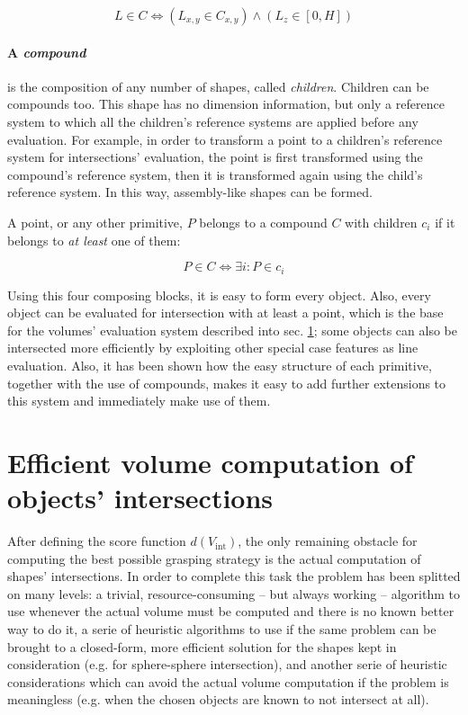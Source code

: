 \begin{equation}
  L \in C \Leftrightarrow
  \left(L_{x,y} \in C_{x,y} \right)
  \wedge
  \left(L_{z} \in [0,H] \right)
\end{equation}

\paragraph{A \emph{compound}} is the composition of any number of shapes, called
\emph{children}. Children can be compounds too. This shape has no dimension
information, but only a reference system to which all the children's reference
systems are applied before any evaluation. For example, in order to transform a
point to a children's reference system for intersections' evaluation, the point
is first transformed using the compound's reference system, then it is
transformed again using the child's reference system. In this way, assembly-like
shapes can be formed.

A point, or any other primitive, $P$ belongs to a compound $C$ with children $c_i$ if it belongs to
\emph{at least} one of them:

\begin{equation}
  P \in C \Leftrightarrow \exists i : P \in c_i
\end{equation}

Using this four composing blocks, it is easy to form every object. Also, every
object can be evaluated for intersection with at least a point, which is the
base for the volumes' evaluation system described into sec.
\ref{sec:grasp_computing}; some objects can also be intersected more efficiently by
exploiting other special case features as line evaluation. Also, it has been
shown how the easy structure of each primitive, together with the use of
compounds, makes it easy to add further extensions to this system and immediately
make use of them.

\section{Efficient volume computation of objects' intersections} \label{sec:grasp_computing}
After defining the score function $d(V_{\text{int}})$, the only remaining
obstacle for computing the best possible grasping strategy is the actual
computation of shapes' intersections. In order to complete this task the problem
has been splitted on many levels: a trivial, resource-consuming -- but always
working -- algorithm to use whenever the actual volume must be computed and
there is no known better way to do it, a serie of heuristic algorithms to use if
the same problem can be brought to a closed-form, more efficient solution for
the shapes kept in consideration (e.g. for sphere-sphere intersection), and
another serie of heuristic considerations which can avoid the actual volume
computation if the problem is meaningless (e.g. when the chosen objects are
known to not intersect at all). 

